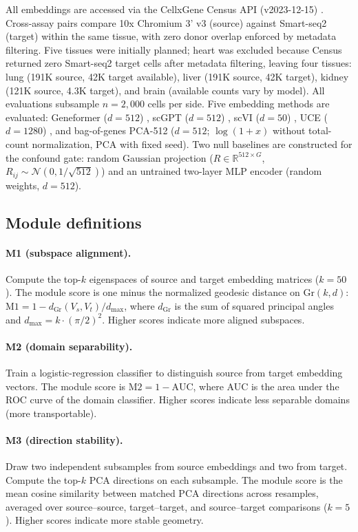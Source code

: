 \documentclass[9pt,lineno]{elife}
\newcommand{\Gr}{\mathrm{Gr}}
\begin{document}
All embeddings are accessed via the CellxGene Census API (v2023-12-15) \citep{abdulla2025cellxgene}. Cross-assay pairs compare 10x Chromium 3' v3 (source) against Smart-seq2 (target) within the same tissue, with zero donor overlap enforced by metadata filtering. Five tissues were initially planned; heart was excluded because Census returned zero Smart-seq2 target cells after metadata filtering, leaving four tissues: lung (191K source, 42K target available), liver (191K source, 42K target), kidney (121K source, 4.3K target), and brain (available counts vary by model). All evaluations subsample $n = 2{,}000$ cells per side. Five embedding methods are evaluated: Geneformer ($d = 512$) \citep{theodoris2023geneformer}, scGPT ($d = 512$) \citep{cui2024scgpt}, scVI ($d = 50$) \citep{lopez2018scvi}, UCE ($d = 1280$) \citep{rosen2026uce}, and bag-of-genes PCA-512 ($d = 512$; $\log(1 + x)$ without total-count normalization, PCA with fixed seed). Two null baselines are constructed for the confound gate: random Gaussian projection ($R \in \mathbb{R}^{512 \times G}$, $R_{ij} \sim \mathcal{N}(0, 1/\sqrt{512})$) and an untrained two-layer MLP encoder (random weights, $d = 512$).

\subsection{Module definitions}

\paragraph{M1 (subspace alignment).} Compute the top-$k$ eigenspaces of source and target embedding matrices ($k = 50$). The module score is one minus the normalized geodesic distance on $\Gr(k, d)$: $\text{M1} = 1 - d_{\Gr}(V_s, V_t) / d_{\max}$, where $d_{\Gr}$ is the sum of squared principal angles and $d_{\max} = k \cdot (\pi/2)^2$. Higher scores indicate more aligned subspaces.

\paragraph{M2 (domain separability).} Train a logistic-regression classifier to distinguish source from target embedding vectors. The module score is $\text{M2} = 1 - \text{AUC}$, where AUC is the area under the ROC curve of the domain classifier. Higher scores indicate less separable domains (more transportable).

\paragraph{M3 (direction stability).} Draw two independent subsamples from source embeddings and two from target. Compute the top-$k$ PCA directions on each subsample. The module score is the mean cosine similarity between matched PCA directions across resamples, averaged over source--source, target--target, and source--target comparisons ($k = 5$). Higher scores indicate more stable geometry.
\end{document}
